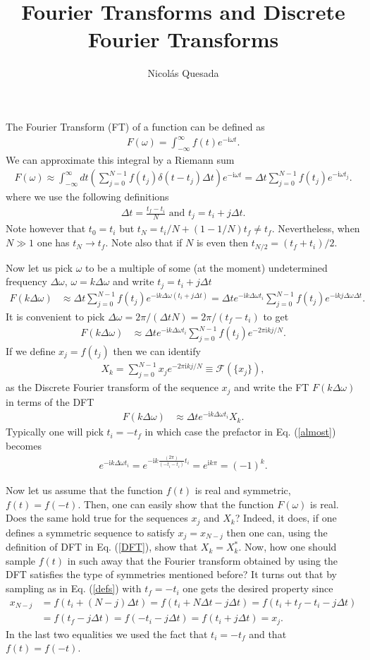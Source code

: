 \documentclass[11pt,letterpaper]{article}
\title{Fourier Transforms and Discrete Fourier Transforms}
\author{Nicol\'as Quesada}
\newcommand{\ii}{\mathrm{i}}
\newcommand{\eq}[1]{\begin{align}#1\end{align}}
\begin{document}
\maketitle
The Fourier Transform (FT) of a function can be defined as
\eq{
F(\omega)=\int_{-\infty}^\infty f(t) e^{-\ii \omega t}.
}
We can approximate this integral by a Riemann sum
\eq{
F(\omega) \approx \int_{-\infty}^\infty dt \left(\sum_{j=0}^{N-1} f(t_j) \delta(t-t_j) \Delta t \right) e^{-\ii \omega t}=\Delta t \sum_{j=0}^{N-1} f(t_j) e^{-\ii \omega t_j}.
}
where we use the following definitions
\eq{\label{defs}
\Delta t=\frac{t_f-t_i}{N} \text{ and } t_j=t_i+j \Delta t.
}
Note however that $t_0=t_i$ but $t_N=t_i/N+(1-1/N) t_f \neq t_f$. Nevertheless, when $N \gg 1$ one has $t_N \to t_f$. Note also that if $N$ is even then $t_{N/2}=(t_f+t_i)/2$. 

Now let us pick $\omega$ to be a multiple of some (at the moment) undetermined frequency $\Delta \omega$, $\omega=k \Delta \omega$ and write $t_j=t_i+j \Delta t$
\eq{
F(k \Delta \omega)&\approx \Delta t\sum_{j=0}^{N-1} f(t_j) e^{-\ii k \Delta \omega (t_i+j \Delta t)}=\Delta t e^{-\ii k \Delta \omega t_i}\sum_{j=0}^{N-1} f(t_j) e^{-\ii k j \Delta \omega  \Delta t}.
}
It is convenient to pick $\Delta \omega = 2 \pi/(\Delta t N)=2 \pi /(t_f-t_i)$ to get
\eq{\label{almost}
F(k \Delta \omega)&\approx \Delta t e^{-\ii k \Delta \omega t_i}\sum_{j=0}^{N-1} f(t_j) e^{-2 \pi \ii k  j/N}.
}
If we define $x_j=f(t_j)$ then we can identify
\eq{\label{DFT}
X_k=\sum_{j=0}^{N-1} x_j e^{-2 \pi \ii k  j/N}\equiv \mathcal{F}\left(\{x_j \}\right),
}
as the Discrete Fourier transform of the sequence $x_j$ and write the FT  $F(k \Delta \omega)$ in terms of the DFT
\eq{\label{quasi}
F(k \Delta \omega)&\approx \Delta t e^{-\ii k \Delta \omega t_i} X_k.
}
Typically one will pick $t_i=-t_f$ in which case the prefactor in Eq. (\ref{almost}) becomes
\eq{
e^{-\ii k \Delta \omega t_i}=e^{-\ii k \frac{(2 \pi)}{(-t_i-t_i)} t_i}=e^{\ii k \pi}=(-1)^k.
}

Now let us assume that the function $f(t)$ is real and symmetric, $f(t)=f(-t)$. Then, one can easily show that the function $F(\omega)$ is real. Does the same hold true for the sequences $x_j$ and $X_k$? Indeed, it does, if one defines a symmetric sequence to satisfy $x_j=x_{N-j}$ then one can, using the definition of DFT in Eq. (\ref{DFT}), show that $X_k=X_k^*$. Now, how one should sample $f(t)$ in such away that the Fourier transform obtained by using the DFT satisfies the type of symmetries mentioned before?
It turns out that by sampling as in Eq. (\ref{defs}) with $t_f=-t_i$ one gets the desired property since
\eq{
x_{N-j}&=f(t_i+(N-j)\Delta t)=f(t_i+N\Delta t-j\Delta t)=f(t_i+t_f-t_i-j \Delta t  )\\
&=f(t_f-j\Delta t )=f(-t_i-j \Delta t )=f(t_i+j \Delta t )=x_j. \nonumber
}
In the last two equalities we used the fact that $t_i=-t_f$ and that $f(t)=f(-t)$.
\end{document}
